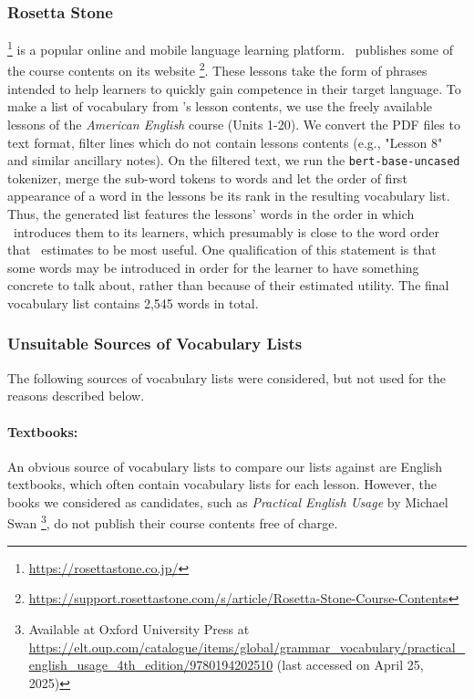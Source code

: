 \subsubsection{Rosetta Stone}
\Rosetta \footnote{\url{https://rosettastone.co.jp/}} is a popular online and mobile language learning platform.
\Rosetta\ publishes some of the course contents on its website \footnote{\url{https://support.rosettastone.com/s/article/Rosetta-Stone-Course-Contents}}.
These lessons take the form of phrases intended to help learners to quickly gain competence in their target language.
To make a list of vocabulary from \Rosetta 's lesson contents, we use the freely available lessons  of the \textit{American English} course (Units 1-20).
We convert the PDF files to text format, filter lines which do not contain lessons contents (e.g., "Lesson 8" and similar ancillary notes).
On the filtered text, we run the \texttt{bert-base-uncased} tokenizer, merge the sub-word tokens to words and let the order of first appearance of a word in the lessons be its rank in the resulting vocabulary list.
Thus, the generated list features the lessons' words in the order in which \Rosetta\ introduces them to its learners, which presumably is close to the word order that \Rosetta\ estimates to be most useful.
One qualification of this statement is that some words may be introduced in order for the learner to have something concrete to talk about, rather than because of their estimated utility.
The final vocabulary list contains 2,545 words in total.

\subsubsection{Unsuitable Sources of Vocabulary Lists}
The following sources of vocabulary lists were considered, but not used for the reasons described below.

\paragraph{Textbooks:}
An obvious source of vocabulary lists to compare our lists against are English textbooks, which often contain vocabulary lists for each lesson.
However, the books we considered as candidates, such as \textit{Practical English Usage} by Michael Swan \footnote{Available at Oxford University Press at \url{https://elt.oup.com/catalogue/items/global/grammar_vocabulary/practical_english_usage_4th_edition/9780194202510} (last accessed on April 25, 2025)}, do not publish their course contents free of charge.

